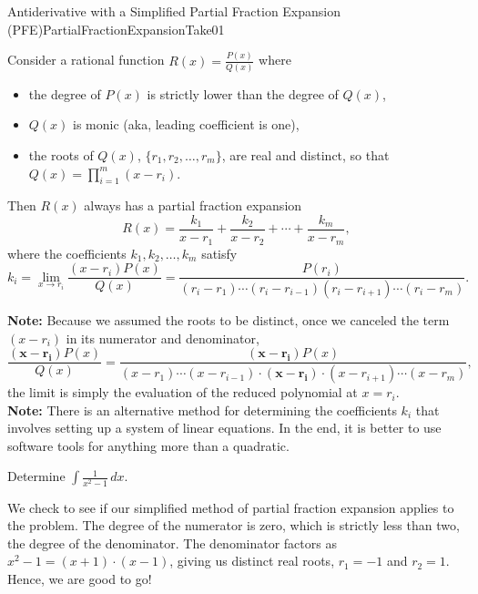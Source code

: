 \begin{propColor}{Antiderivative with a Simplified Partial Fraction Expansion (PFE)}{PartialFractionExpansionTake01}

Consider a rational function $R(x) =  \frac{P(x)}{Q(x)}$ where 
\begin{itemize}
    \item the degree of $P(x)$ is strictly lower than the degree of $Q(x)$,
    \item  $Q(x)$ is monic (aka, leading coefficient is one),
    \item the roots of $Q(x)$, $\{r_1, r_2, \ldots, r_m\}$, are real and distinct, so that $Q(x) = \prod_{i=1}^{m} (x-r_i).$
\end{itemize}
Then $R(x)$ always has a partial fraction expansion
\begin{equation}
    R(x) = \frac{k_1}{x - r_1} + \frac{k_2}{x - r_2} + \cdots + \frac{k_m}{x - r_m},
\end{equation}
 where the coefficients $k_1, k_2, \ldots, k_m$ satisfy
 \begin{equation}
     k_i = \lim_{x \to r_i} \frac{(x-r_i) P(x)}{Q(x)} = \frac{P(r_i)}{(r_i-r_1) \cdots (r_i-r_{i-1})(r_i - r_{i+1}) \cdots (r_i-r_m)}.
 \end{equation}
 
 \bigskip

 \textbf{Note:} Because we assumed the roots to be distinct, once we canceled the term $(x-r_i)$ in its numerator and denominator, 
 $$\frac{\bm{(x-r_i)} P(x)}{Q(x)} = \frac{\bm{(x-r_i)} P(x)}{(x-r_1) \cdots (x- r_{i-1})\cdot \bm{(x-r_i)} \cdot (x - r_{i+1}) \cdots (x -r_m)},$$
 the limit is simply the evaluation of the reduced polynomial at $x = r_i$. \\

\textbf{Note:} There is an alternative method for determining the coefficients $k_i$ that involves setting up a system of linear equations. In the end, it is better to use software tools for anything more than a quadratic.    
\end{propColor}

\bigskip

\begin{example}
    Determine \( \int \frac{1}{x^2 - 1} \, dx \).
\end{example}
\solution We check to see if our simplified method of partial fraction expansion applies to the problem. The degree of the numerator is zero, which is strictly less than two, the degree of the denominator. The denominator factors as $x^2-1 = (x+1)\cdot (x-1)$, giving us distinct real roots, $r_1 = -1$ and $r_2 = 1$. Hence, we are good to go!\\


